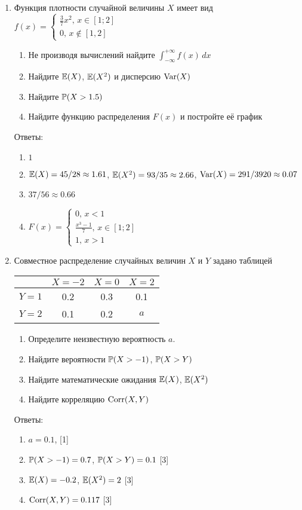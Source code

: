 \documentclass[pdftex,12pt,a4paper]{article}
\begin{document}
\begin{enumerate}
\item Функция плотности случайной величины $X$ имеет вид $f(x)=\left\{\begin{array}{l}
\frac{3}{7}x^2,\, x\in[1;2] \\
0,\, x\notin [1,2] 
\end{array}\right.$
\begin{enumerate}
\item Не производя вычислений найдите $\int_{-\infty}^{+\infty}f(x)\,dx$
\item Найдите $\E(X)$, $\E(X^2)$ и дисперсию $\Var(X)$
\item Найдите $\P(X>1.5)$
\item Найдите функцию распределения $F(x)$ и постройте её график
\end{enumerate}

Ответы:
\begin{enumerate}
\item $1$
\item $\E(X)=45/28\approx 1.61$, $\E(X^2)=93/35\approx 2.66$, $\Var(X)=291/3920\approx 0.07$
\item $37/56\approx 0.66$
\item $F(x)=\begin{cases} 0,\, x<1 \\ 
\frac{x^3-1}{7},\, x\in [1;2] \\ 
1,\, x>1 \end{cases}$
\end{enumerate}

\item Совместное распределение случайных величин $X$ и $Y$ задано таблицей

\begin{tabular}{c|ccc}
 & $X=-2$ & $X=0$ & $X=2$ \\ 
\hline 
$Y=1$ & 0.2 & 0.3 & 0.1 \\ 
$Y=2$ & 0.1 & 0.2 & $a$ \\ 
\end{tabular} 

\begin{enumerate}
\item Определите неизвестную вероятность $a$. 
\item Найдите вероятности $\P(X>-1)$, $\P(X>Y)$
\item Найдите математические ожидания $\E(X)$, $\E(X^2)$
\item Найдите корреляцию $\Corr(X,Y)$
\end{enumerate}

Ответы:
\begin{enumerate}
\item $a=0.1$, [1]
\item $\P(X>-1)=0.7$, $\P(X>Y)=0.1$ [3]
\item $\E(X)=-0.2$, $\E(X^2)=2$ [3]
\item $\Corr(X,Y)=0.117$ [3]
\end{enumerate}


\end{enumerate}
\end{document}
